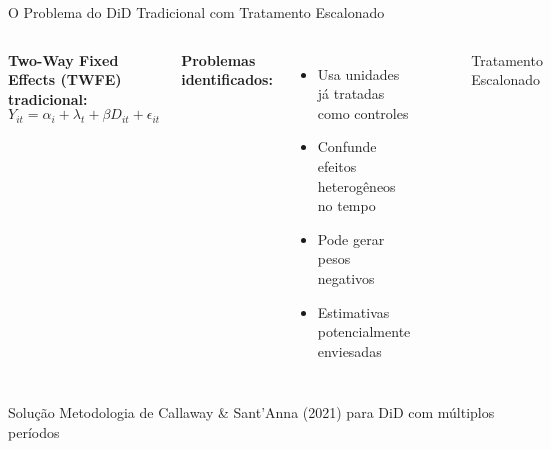 \documentclass[10pt,aspectratio=169]{beamer}
\begin{document}
\begin{frame}{O Problema do DiD Tradicional com Tratamento Escalonado}
\begin{columns}
\textbf{Two-Way Fixed Effects (TWFE) tradicional:}
$$Y_{it} = \alpha_i + \lambda_t + \beta D_{it} + \epsilon_{it}$$

\textbf{Problemas identificados:}
\begin{itemize}
    \item Usa unidades já tratadas como controles
    \item Confunde efeitos heterogêneos no tempo
    \item Pode gerar pesos negativos
    \item Estimativas potencialmente enviesadas
\end{itemize}

\begin{figure}
\centering
{}
\caption{Tratamento Escalonado}
\end{figure}
\end{columns}

\begin{alertblock}{Solução}
Metodologia de Callaway \& Sant'Anna (2021) para DiD com múltiplos períodos
\end{alertblock}
\end{frame}
\end{document}
